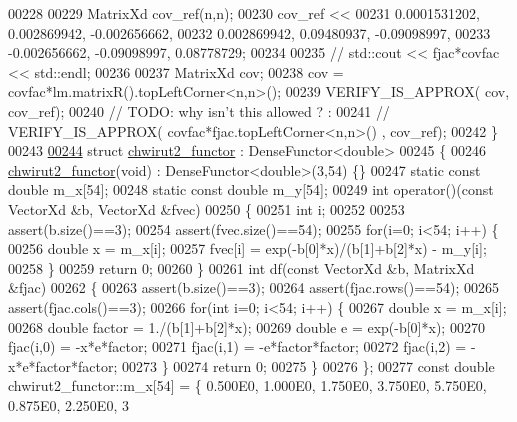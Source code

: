 \begin{DoxyCode}
00228 
00229   MatrixXd cov\_ref(n,n);
00230   cov\_ref <<
00231       0.0001531202,   0.002869942,  -0.002656662,
00232       0.002869942,    0.09480937,   -0.09098997,
00233       -0.002656662,   -0.09098997,    0.08778729;
00234 
00235 \textcolor{comment}{//  std::cout << fjac*covfac << std::endl;}
00236 
00237   MatrixXd cov;
00238   cov =  covfac*lm.matrixR().topLeftCorner<n,n>();
00239   VERIFY\_IS\_APPROX( cov, cov\_ref);
00240   \textcolor{comment}{// TODO: why isn't this allowed ? :}
00241   \textcolor{comment}{// VERIFY\_IS\_APPROX( covfac*fjac.topLeftCorner<n,n>() , cov\_ref);}
00242 \}
00243 
\hyperlink{structchwirut2__functor}{00244} \textcolor{keyword}{struct }\hyperlink{structchwirut2__functor}{chwirut2\_functor} : DenseFunctor<double>
00245 \{
00246     \hyperlink{structchwirut2__functor}{chwirut2\_functor}(\textcolor{keywordtype}{void}) : DenseFunctor<double>(3,54) \{\}
00247     \textcolor{keyword}{static} \textcolor{keyword}{const} \textcolor{keywordtype}{double} m\_x[54];
00248     \textcolor{keyword}{static} \textcolor{keyword}{const} \textcolor{keywordtype}{double} m\_y[54];
00249     \textcolor{keywordtype}{int} operator()(\textcolor{keyword}{const} VectorXd &b, VectorXd &fvec)
00250     \{
00251         \textcolor{keywordtype}{int} i;
00252 
00253         assert(b.size()==3);
00254         assert(fvec.size()==54);
00255         \textcolor{keywordflow}{for}(i=0; i<54; i++) \{
00256             \textcolor{keywordtype}{double} x = m\_x[i];
00257             fvec[i] = exp(-b[0]*x)/(b[1]+b[2]*x) - m\_y[i];
00258         \}
00259         \textcolor{keywordflow}{return} 0;
00260     \}
00261     \textcolor{keywordtype}{int} df(\textcolor{keyword}{const} VectorXd &b, MatrixXd &fjac)
00262     \{
00263         assert(b.size()==3);
00264         assert(fjac.rows()==54);
00265         assert(fjac.cols()==3);
00266         \textcolor{keywordflow}{for}(\textcolor{keywordtype}{int} i=0; i<54; i++) \{
00267             \textcolor{keywordtype}{double} x = m\_x[i];
00268             \textcolor{keywordtype}{double} factor = 1./(b[1]+b[2]*x);
00269             \textcolor{keywordtype}{double} e = exp(-b[0]*x);
00270             fjac(i,0) = -x*e*factor;
00271             fjac(i,1) = -e*factor*factor;
00272             fjac(i,2) = -x*e*factor*factor;
00273         \}
00274         \textcolor{keywordflow}{return} 0;
00275     \}
00276 \};
00277 \textcolor{keyword}{const} \textcolor{keywordtype}{double} chwirut2\_functor::m\_x[54] = \{ 0.500E0, 1.000E0, 1.750E0, 3.750E0, 5.750E0, 0.875E0, 2.250E0, 3

\end{DoxyCode}
